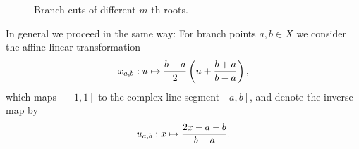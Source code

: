 \documentclass[main.tex]{subfiles}
\begin{document}
  \begin{figure}[H]
      \begin{center}
      \end{center}
      \caption{Branch cuts of different $m$-th roots.}
  \label{fig:mth_root_pol} \end{figure}

  In general we proceed in the same way: For branch points $a,b \in X$ we consider the affine linear
  transformation
  \begin{equation*}
      \label{def:xab}
      x_{a,b} : u \mapsto \frac{b-a}{2}\left(u+\frac{b+a}{b-a}\right),
  \end{equation*}
  which maps $[-1,1]$ to the complex line segment $[a,b]$, and denote the inverse map by
  \begin{equation*}
      \label{def:uab}
      u_{a,b} : x \mapsto \frac{2x-a-b}{b-a}.
  \end{equation*}
\end{document}

